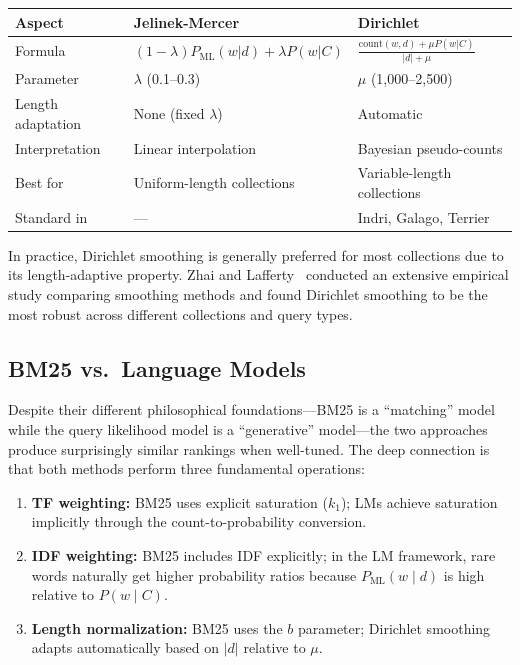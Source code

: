 \documentclass[11pt,a4paper]{article}
\theoremstyle{definition}
\theoremstyle{plain}
\begin{document}
\begin{center}
\small
\begin{tabular}{lll}
\toprule
\textbf{Aspect} & \textbf{Jelinek-Mercer} & \textbf{Dirichlet} \\
\midrule
Formula & $(1{-}\lambda) P_\text{ML}(w|d) + \lambda P(w|C)$ & $\frac{\text{count}(w,d) + \mu P(w|C)}{|d| + \mu}$ \\
Parameter & $\lambda$ (0.1--0.3) & $\mu$ (1{,}000--2{,}500) \\
Length adaptation & None (fixed $\lambda$) & Automatic \\
Interpretation & Linear interpolation & Bayesian pseudo-counts \\
Best for & Uniform-length collections & Variable-length collections \\
Standard in & --- & Indri, Galago, Terrier \\
\bottomrule
\end{tabular}
\end{center}

In practice, Dirichlet smoothing is generally preferred for most collections due to its length-adaptive property. Zhai and Lafferty~\cite{zhai2004study} conducted an extensive empirical study comparing smoothing methods and found Dirichlet smoothing to be the most robust across different collections and query types.

\subsection{BM25 vs.\ Language Models}

Despite their different philosophical foundations---BM25 is a ``matching'' model while the query likelihood model is a ``generative'' model---the two approaches produce surprisingly similar rankings when well-tuned. The deep connection is that both methods perform three fundamental operations:

\begin{enumerate}
    \item \textbf{TF weighting:} BM25 uses explicit saturation ($k_1$); LMs achieve saturation implicitly through the count-to-probability conversion.
    \item \textbf{IDF weighting:} BM25 includes IDF explicitly; in the LM framework, rare words naturally get higher probability ratios because $P_\text{ML}(w \mid d)$ is high relative to $P(w \mid C)$.
    \item \textbf{Length normalization:} BM25 uses the $b$ parameter; Dirichlet smoothing adapts automatically based on $|d|$ relative to $\mu$.
\end{enumerate}
\end{document}
